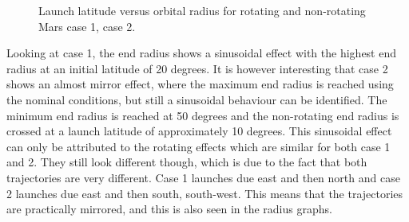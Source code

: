 \begin{figure}[H]
\centering
{} 
\caption{Launch latitude versus orbital radius for rotating and non-rotating Mars \protect{} case 1,  \protect{} case 2. } 
\label{fig:launchLatitudeVsRadiusCase1combined} 
\end{figure} 

\noindent
Looking at case 1, the end radius shows a sinusoidal effect with the highest end radius at an initial latitude of 20 degrees. It is however interesting that case 2 shows an almost mirror effect, where the maximum end radius is reached using the nominal conditions, but still a sinusoidal behaviour can be identified. The minimum end radius is reached at 50 degrees and the non-rotating end radius is crossed at a launch latitude of approximately 10 degrees. This sinusoidal effect can only be attributed to the rotating effects which are similar for both case 1 and 2. They still look different though, which is due to the fact that both trajectories are very different. Case 1 launches due east and then north and case 2 launches due east and then south, south-west. This means that the trajectories are practically mirrored, and this is also seen in the radius graphs. \\

